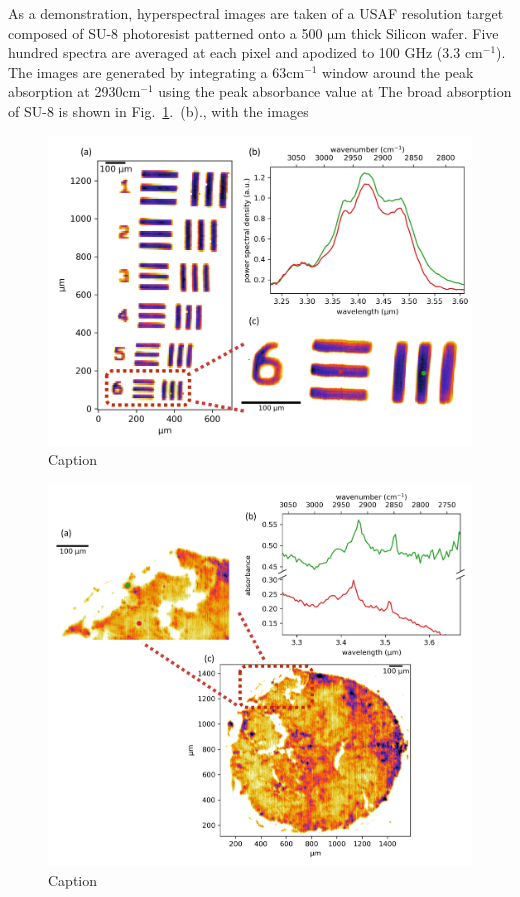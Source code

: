 \documentclass{optica-article}
\begin{document}
As a demonstration, hyperspectral images are taken of a USAF resolution target composed of SU-8 photoresist patterned onto a 500 $\mathrm{\mu m}$ thick Silicon wafer. Five hundred spectra are averaged at each pixel and apodized to 100 GHz (3.3 $\mathrm{cm^{-1}}$). The images are generated by integrating a 63$\mathrm{cm^{-1}}$ window around the peak absorption at 2930$\mathrm{cm^{-1}}$ using the peak absorbance value at The broad absorption of SU-8 is shown in Fig.~\ref{fig:su8}.~(b)., with the images 

\begin{figure}[h]
    \centering
    \includegraphics[width=\linewidth]{su8_image.png}
    \caption{Caption}
    \label{fig:su8}
\end{figure}

\begin{figure}[h]
    \centering
    \includegraphics[width=\linewidth]{bio_image.png}
    \caption{Caption}
    \label{fig:bio}
\end{figure}
\end{document}

